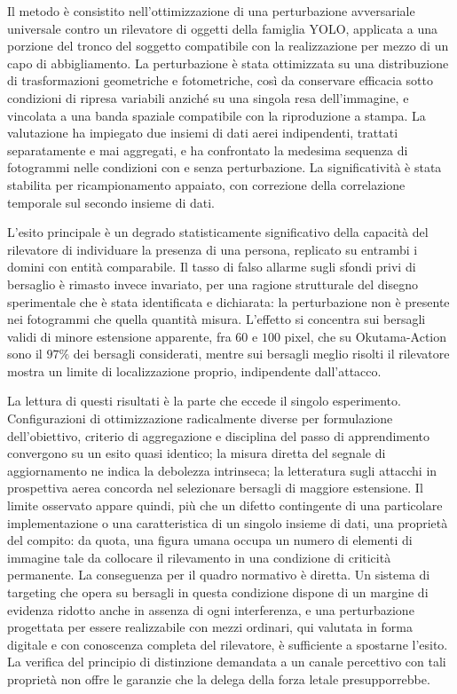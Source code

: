 \ifstampa\documentclass[a4paper,12pt,twoside,openright]{report}\else\documentclass[a4paper,12pt]{report}\fi
\newif\ifrevisione \revisionefalse
\DeclareRobustCommand{\rev}[1]{\ifrevisione{\color{blue!65!black}#1}\else#1\fi}
\begin{document}
Il metodo è consistito nell'ottimizzazione di una perturbazione avversariale universale contro un rilevatore di oggetti della famiglia YOLO, applicata a una porzione del \rev{tronco} del soggetto compatibile con la realizzazione per mezzo di un capo di abbigliamento. La perturbazione è stata ottimizzata su una distribuzione di trasformazioni geometriche e fotometriche, così da conservare efficacia sotto condizioni di ripresa variabili anziché su una singola resa dell'immagine, e vincolata a una banda spaziale compatibile con la riproduzione a stampa. La valutazione ha impiegato due insiemi di dati aerei indipendenti, trattati separatamente e mai aggregati, e ha confrontato la medesima sequenza di fotogrammi nelle condizioni con e senza perturbazione. La significatività è stata stabilita per ricampionamento appaiato, con correzione della correlazione temporale sul secondo insieme di dati.

L'esito principale è un degrado statisticamente significativo della capacità del rilevatore di individuare la presenza di una persona, replicato su entrambi i domini con entità comparabile. Il tasso di falso allarme sugli sfondi privi di bersaglio è rimasto invece invariato, per una ragione strutturale del disegno sperimentale che è stata identificata e dichiarata: la perturbazione non è presente nei fotogrammi che quella quantità misura. L'effetto si concentra sui bersagli \rev{validi di minore estensione apparente, fra $60$ e $100$ pixel, che su Okutama-Action sono il $97\%$ dei bersagli considerati}, mentre sui bersagli meglio risolti il rilevatore mostra un limite di localizzazione proprio, indipendente dall'attacco.

La lettura di questi risultati è la parte che eccede il singolo esperimento. Configurazioni di ottimizzazione radicalmente diverse per formulazione dell'obiettivo, criterio di aggregazione e disciplina del passo di apprendimento convergono su un esito quasi identico; la misura diretta del segnale di aggiornamento ne indica la debolezza intrinseca; la letteratura sugli attacchi in prospettiva aerea concorda nel selezionare bersagli di maggiore estensione. Il limite osservato \rev{appare quindi, più che un difetto contingente di una particolare implementazione o una caratteristica di un singolo insieme di dati, una proprietà del compito}: da quota, una figura umana occupa un numero di elementi di immagine tale da collocare il rilevamento in una condizione di criticità permanente. La conseguenza per il quadro normativo è diretta. Un sistema di targeting che opera su bersagli in questa condizione dispone di un margine di evidenza ridotto anche in assenza di ogni interferenza, e una perturbazione \rev{progettata per essere realizzabile con mezzi ordinari, qui valutata in forma digitale e con conoscenza completa del rilevatore,} è sufficiente a spostarne l'esito. La verifica del principio di distinzione demandata a un canale percettivo con tali proprietà non offre le garanzie che la delega della forza letale presupporrebbe.
\end{document}
